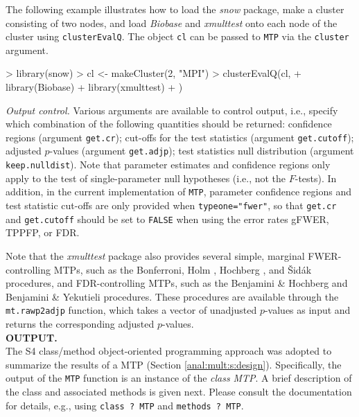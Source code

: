 \documentclass[11pt]{article}
\newcommand{\Rpackage}[1]{\textit{#1}}
\newcommand{\Robject}[1]{\texttt{#1}}
\newcommand{\Rclass}[1]{\textit{#1}}
\begin{document}
\begin{description}
The following example illustrates how to load the \Rpackage{snow} package, make a cluster consisting 
of two nodes, and load \Rpackage{Biobase} and \Rpackage{xmulttest} onto each node of the 
cluster using \Robject{clusterEvalQ}. The object \Robject{cl} can be passed to \Robject{MTP} via
the \Robject{cluster} argument. 

\begin{Schunk}
\begin{Sinput}
> library(snow)
> cl <- makeCluster(2, "MPI")
> clusterEvalQ(cl, {
+     library(Biobase)
+     library(xmulttest)
+ })
\end{Sinput}
\end{Schunk}

\item{\em Output control.} 
Various arguments are available to control output, i.e., specify which combination of the following quantities should be returned: 
confidence regions (argument \Robject{get.cr}); 
cut-offs for the test statistics (argument \Robject{get.cutoff}); 
adjusted $p$-values (argument \Robject{get.adjp}); 
test statistics null distribution  (argument \Robject{keep.nulldist}). 
Note that parameter estimates and confidence regions only apply to the test of single-parameter null hypotheses (i.e., not the $F$-tests). 
In addition, in the current implementation of \Robject{MTP}, parameter confidence regions and test statistic cut-offs are only provided when \texttt{typeone="fwer"}, so that \Robject{get.cr} and \Robject{get.cutoff} should be set to \Robject{FALSE} when using the error rates gFWER, TPPFP, or FDR.


\end{description}

Note that the \Rpackage{xmulttest} package also provides several simple, marginal FWER-controlling MTPs, such as the Bonferroni, Holm \cite{Holm79}, Hochberg \cite{Hochberg88}, and \v{S}id\'{a}k \cite{Sidak67} procedures, and FDR-controlling MTPs, such as the Benjamini \& Hochberg \cite{Benjamini&Hochberg95} and Benjamini \& Yekutieli \cite{Benjamini&Yekutieli01} procedures. 
These procedures are available through the \Robject{mt.rawp2adjp} function, which takes a vector of unadjusted $p$-values as input and returns the corresponding adjusted $p$-values.\\


\noindent
{\bf  OUTPUT.}\\


The S4 class/method object-oriented programming approach was adopted to summarize the results of a MTP (Section \ref{anal:mult:s:design}). 
Specifically, the output of the \Robject{MTP} function is an instance of the {\em class} \Rclass{MTP}. 
A brief description of the class and associated methods is given next. Please consult the documentation for details, e.g., using \texttt{class ? MTP} and \texttt{methods ? MTP}. 
\end{document}
